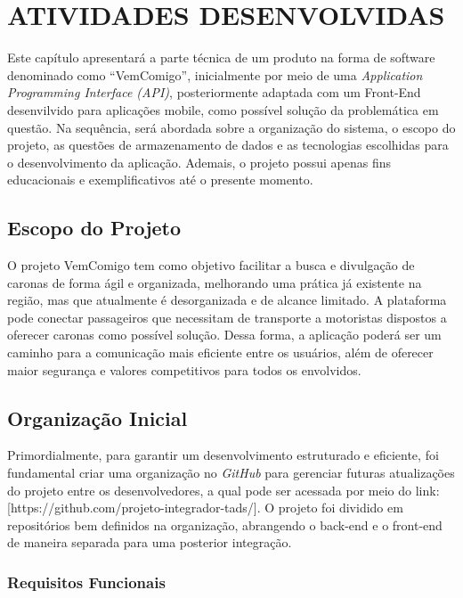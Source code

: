 \chapter{ATIVIDADES DESENVOLVIDAS}

Este capítulo apresentará a parte técnica de um produto na forma de software denominado como ``VemComigo'', inicialmente por meio de uma \textit{Application Programming Interface (API)}, posteriormente adaptada com um Front-End desenvilvido para aplicações mobile, como possível solução da problemática em questão. Na sequência, será abordada sobre a organização do sistema, o escopo do projeto, as questões de armazenamento de dados e as tecnologias escolhidas para o desenvolvimento da aplicação. Ademais, o projeto possui apenas fins educacionais e exemplificativos até o presente momento.

\section{Escopo do Projeto}

O projeto VemComigo tem como objetivo facilitar a busca e divulgação de caronas de forma ágil e organizada, melhorando uma prática já existente na região, mas que atualmente é desorganizada e de alcance limitado.  A plataforma pode conectar passageiros que necessitam de transporte a motoristas dispostos a oferecer caronas como possível solução. Dessa forma, a aplicação poderá ser um caminho para a comunicação mais eficiente entre os usuários, além de oferecer maior segurança e valores competitivos para todos os envolvidos.


\section{Organização Inicial}

Primordialmente, para garantir um desenvolvimento estruturado e eficiente, foi fundamental criar uma organização no\textit{ GitHub} para gerenciar futuras atualizações do projeto entre os desenvolvedores, a qual pode ser acessada por meio do link: [https://github.com/projeto-integrador-tads/]. O projeto foi dividido em repositórios bem definidos na organização, abrangendo o back-end e o front-end de maneira separada para uma posterior integração.

\subsection{Requisitos Funcionais}

